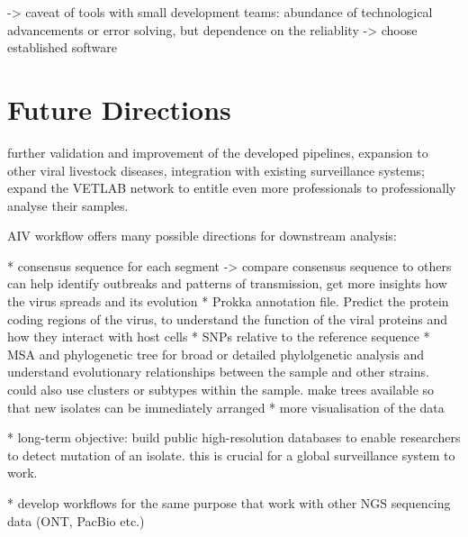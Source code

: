 -> caveat of tools with small development teams: abundance of technological advancements or error solving, but dependence on the reliablity -> choose established software



\section{Future Directions}
\todoit
further validation and improvement of the developed pipelines, expansion to other viral livestock diseases, integration with existing surveillance systems; expand the \ac{VETLAB} network to entitle even more professionals to professionally analyse their samples.

\ac{AIV} workflow offers many possible directions for downstream analysis:

* consensus sequence for each segment -> compare consensus sequence to others can help identify outbreaks and patterns of transmission, get more insights how the virus spreads and its evolution
* Prokka annotation file. Predict the protein coding regions of the virus, to understand the function of the viral proteins and how they interact with host cells
* SNPs relative to the reference sequence
* \ac{MSA} and phylogenetic tree for broad or detailed phylolgenetic analysis and understand evolutionary relationships between the sample and other strains. could also use clusters or subtypes within the sample. make trees available so that new isolates can be immediately arranged
* more visualisation of the data

* long-term objective: build public high-resolution databases to enable researchers to detect mutation of an isolate. this is crucial for a global surveillance system to work.

* develop workflows for the same purpose that work with other NGS sequencing data (ONT, PacBio etc.)